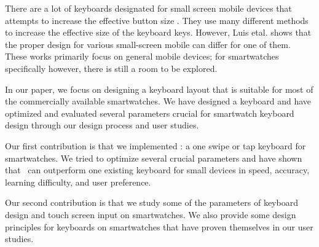 There are a lot of keyboards designated for small screen mobile devices that attempts to increase the effective button size \cite{zoomboard,swipeboard,text-entry-on-small-qwerty}.
They use many different methods to increase the effective size of the keyboard keys.
 However, Luis etal. \cite{text-entry-on-small-qwerty} shows that the proper design for various small-screen mobile can differ for one of them. These works primarily focus on general mobile devices; for smartwatches specifically however, there is still a room to be explored.

In our paper, we focus on designing a keyboard layout that is suitable for most of the commercially available smartwatches. We have designed a keyboard and have optimized and evaluated several parameters crucial for smartwatch keyboard design through our design process and user studies.

Our first contribution is that we implemented \papertitle: a one swipe or tap keyboard for smartwatches. We tried to optimize several crucial parameters and have shown that \papertitle\ can outperform one existing keyboard for small devices in speed, accuracy, learning difficulty, and user preference.

Our second contribution is that we study some of the parameters of keyboard design and touch screen input on smartwatches. We also provide some design principles for keyboards on smartwatches that have proven themselves in our user studies.
